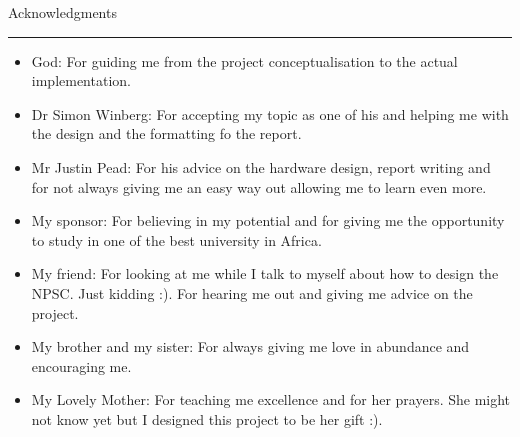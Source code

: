 {\Large Acknowledgments}\\
\hrule

\begin{itemize}
	\item God:    For guiding me from the project conceptualisation to the actual implementation.
	\item Dr Simon Winberg: For accepting my topic as one of his and helping me with the design and the formatting fo the report.
	\item Mr Justin Pead: For his advice on the hardware design, report writing and for not always giving me an easy way out allowing me to learn even more.
	\item My sponsor: For believing in my potential and for giving me the opportunity to study in one of the best university in Africa.
	\item My friend: For looking at me while I talk to myself about how to design the NPSC. Just kidding :). For hearing me out and giving me advice on the project.
	\item My brother and my sister: For always giving me love in abundance and encouraging me.
	\item My Lovely Mother: For teaching me excellence and for her prayers. She might not know yet but I designed this project to be her gift :).
\end{itemize}